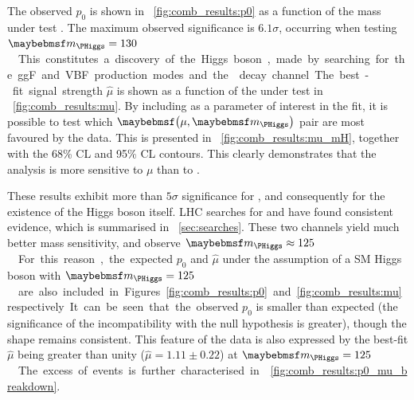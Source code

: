 The observed $p_0$ is shown in \Figure~\ref{fig:comb_results:p0} as a function of the mass 
under test \mH.  The maximum observed significance is $6.1\sigma$, occurring when testing 
\unit{$\mH = 130$}{\GeV}. This constitutes a discovery of the Higgs boson, made by searching 
for the ggF and VBF production modes and the \WW decay channel.

The best-fit signal strength $\hat{\mu}$ is shown as a function of the \mH under test in 
\Figure~\ref{fig:comb_results:mu}. By including \mH as a parameter of interest in the fit, 
it is possible to test which $\parenths{\mu, \mH}$ pair are most favoured by the data. This 
is presented in \Figure~\ref{fig:comb_results:mu_mH}, together with the 68\% CL and 95\% CL 
contours. This clearly demonstrates that the analysis is more sensitive to $\mu$ than to \mH.

These results exhibit more than $5\sigma$ significance for \HWWlvlv, and consequently for 
the existence of the Higgs boson itself. LHC searches for 
\HepProcess{\PHiggs \HepTo \Pphoton\Pphoton} and \HepProcess{\PHiggs \HepTo \PZ\PZ} have 
found consistent evidence, which is summarised in \Section~\ref{sec:searches}. These two 
channels yield much better mass sensitivity, and observe \unit{$\mH \approx 125$}{\GeV}. 
For this reason, the expected $p_0$ and $\hat{\mu}$ under the assumption of a SM Higgs boson 
with \unit{$\mH = 125$}{\GeV} are also included in Figures~\ref{fig:comb_results:p0} and 
\ref{fig:comb_results:mu} respectively. It can be seen that the observed $p_0$ is smaller 
than expected (\ie the significance of the incompatibility with the null hypothesis is 
greater), though the shape remains consistent. This feature of the data is also expressed by 
the best-fit $\hat{\mu}$ being greater than unity ($\hat{\mu} = 1.11 \pm 0.22$) at 
\unit{$\mH = 125$}{\GeV}. The excess of events is further characterised in 
\Figure~\ref{fig:comb_results:p0_mu_breakdown}.

